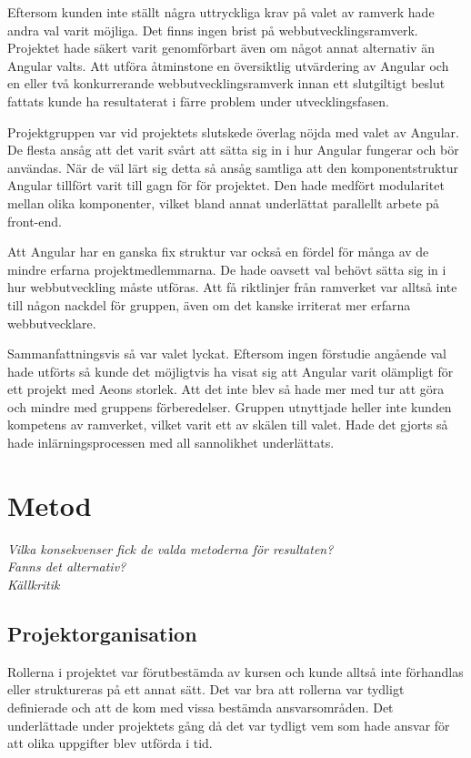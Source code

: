 Eftersom kunden inte ställt några uttryckliga krav på valet av ramverk hade andra val varit möjliga. Det finns ingen brist på webbutvecklingsramverk. Projektet hade säkert varit genomförbart även om något annat alternativ än Angular valts. Att utföra åtminstone en översiktlig utvärdering av Angular och en eller två konkurrerande webbutvecklingsramverk innan ett slutgiltigt beslut fattats kunde ha resultaterat i färre problem under utvecklingsfasen.

Projektgruppen var vid projektets slutskede överlag nöjda med valet av Angular. De flesta ansåg att det varit svårt att sätta sig in i hur Angular fungerar och bör användas. När de väl lärt sig detta så ansåg samtliga att den komponentstruktur Angular tillfört varit till gagn för för projektet. Den hade medfört modularitet mellan olika komponenter, vilket bland annat underlättat parallellt arbete på front-end.

Att Angular har en ganska fix struktur var också en fördel för många av de mindre erfarna projektmedlemmarna. De hade oavsett val behövt sätta sig in i hur webbutveckling måste utföras. Att få riktlinjer från ramverket var alltså inte till någon nackdel för gruppen, även om det kanske irriterat mer erfarna webbutvecklare.

Sammanfattningsvis så var valet lyckat. Eftersom ingen förstudie angående val hade utförts så kunde det möjligtvis ha visat sig att Angular varit olämpligt för ett projekt med Aeons storlek. Att det inte blev så hade mer med tur att göra och mindre med gruppens förberedelser. Gruppen utnyttjade heller inte kunden kompetens av ramverket, vilket varit ett av skälen till valet. Hade det gjorts så hade inlärningsprocessen med all sannolikhet underlättats.

\section{Metod}
\emph{Vilka konsekvenser fick de valda metoderna för resultaten?} \\
\emph{Fanns det alternativ?}\\
\emph{Källkritik}\\

\subsection{Projektorganisation}
Rollerna i projektet var förutbestämda av kursen och kunde alltså inte förhandlas eller struktureras på ett annat sätt. Det var bra att rollerna var tydligt definierade och att de kom med vissa bestämda ansvarsområden. Det underlättade under projektets gång då det var tydligt vem som hade ansvar för att olika uppgifter blev utförda i tid.

